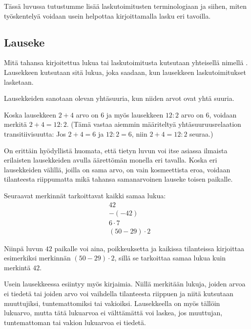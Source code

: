 Tässä luvussa tutustumme lisää laskutoimitusten terminologiaan ja siihen, miten työskentelyä voidaan usein helpottaa kirjoittamalla lasku eri tavoilla.

\subsection{Lauseke}

Mitä tahansa kirjoitettua lukua tai laskutoimitusta kutsutaan yhteisellä nimellä . Lausekkeen  kutsutaan sitä lukua, joka saadaan, kun lausekkeen laskutoimitukset lasketaan.

\begin{esimerkki}
\end{esimerkki}

Lausekkeiden sanotaan olevan yhtäsuuria, kun niiden arvot ovat yhtä suuria.

\begin{esimerkki}
Koska lausekkeen $2+4$ arvo on $6$ ja myös lausekkeen $12:2$ arvo on $6$, voidaan merkitä $2+4=12:2$. (Tämä vastaa aiemmin määriteltyä yhtäsuuruusrelaation transitiivisuutta: Jos $2+4=6$ ja $12:2=6$, niin $2+4=12:2$ seuraa.)
\end{esimerkki}

On erittäin hyödyllistä huomata, että tietyn luvun voi itse asiassa ilmaista erilaisten lausekkeiden avulla äärettömän monella eri tavalla. Koska eri lausekkeiden välillä, joilla on sama arvo, on vain kosmeettista eroa, voidaan tilanteesta riippumatta mikä tahansa samanarvoinen lauseke  toisen paikalle.

\begin{esimerkki}
Seuraavat merkinnät tarkoittavat kaikki samaa lukua:
\begin{align*}
                &42 \\ &-(-42) \\ &6 \cdot 7 \\ &(50-29) \cdot 2
\end{align*}

Niinpä luvun $42$ paikalle voi aina, poikkeuksetta ja kaikissa tilanteissa kirjoittaa esimerkiksi merkinnän $(50-29)\cdot 2$, sillä se tarkoittaa samaa lukua kuin merkintä $42$.
\end{esimerkki}

Usein lausekkeessa esiintyy myös kirjaimia. Niillä merkitään lukuja, joiden arvoa ei tiedetä tai joiden arvo voi vaihdella tilanteesta riippuen ja niitä kutsutaan muuttujiksi, tuntemattomiksi tai vakioiksi. Lausekkeella on myös tällöin lukuarvo, mutta tätä lukuarvoa ei välttämättä voi laskea, jos muuttujan, tuntemattoman tai vakion lukuarvoa ei tiedetä. %

